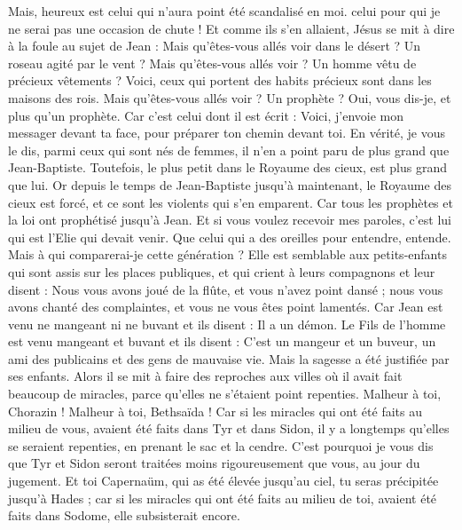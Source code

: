 \begin{multicols}{2}
Mais, heureux est celui qui n’aura point été scandalisé en moi.
celui pour qui je ne serai pas une occasion de chute !
Et comme ils s'en allaient, Jésus se mit à dire à la foule au sujet de Jean : Mais qu'êtes-vous allés voir dans le désert ? Un roseau agité par le vent ?
Mais qu'êtes-vous allés voir ? Un homme vêtu de précieux vêtements ? Voici, ceux qui portent des habits précieux sont dans les maisons des rois.
Mais qu'êtes-vous allés voir ? Un prophète ? Oui, vous dis-je, et plus qu'un prophète.
Car c’est celui dont il est écrit : Voici, j'envoie mon messager devant ta face, pour préparer ton chemin devant toi.
En vérité, je vous le dis, parmi ceux qui sont nés de femmes, il n'en a point paru de plus grand que Jean-Baptiste. Toutefois, le plus petit dans le Royaume des cieux, est plus grand que lui.
Or depuis le temps de Jean-Baptiste jusqu’à maintenant, le Royaume des cieux est forcé, et ce sont les violents qui s’en emparent.
Car tous les prophètes et la loi ont prophétisé jusqu'à Jean.
Et si vous voulez recevoir mes paroles, c'est lui qui est l'Elie qui devait venir.
Que celui qui a des oreilles pour entendre, entende.
Mais à qui comparerai-je cette génération ? Elle est semblable aux petits-enfants qui sont assis sur les places publiques, et qui crient à leurs compagnons
et leur disent : Nous vous avons joué de la flûte, et vous n'avez point dansé ; nous vous avons chanté des complaintes, et vous ne vous êtes point lamentés.
Car Jean est venu ne mangeant ni ne buvant et ils disent : Il a un démon.
Le Fils de l'homme est venu mangeant et buvant et ils disent : C’est un mangeur et un buveur, un ami des publicains et des gens de mauvaise vie. Mais la sagesse a été justifiée par ses enfants.
Alors il se mit à faire des reproches aux villes où il avait fait beaucoup de miracles, parce qu’elles ne s'étaient point repenties.
Malheur à toi, Chorazin ! Malheur à toi, Bethsaïda ! Car si les miracles qui ont été faits au milieu de vous, avaient été faits dans Tyr et dans Sidon, il y a longtemps qu'elles se seraient repenties, en prenant le sac et la cendre.
C'est pourquoi je vous dis que Tyr et Sidon seront traitées moins rigoureusement que vous, au jour du jugement.
Et toi Capernaüm, qui as été élevée jusqu’au ciel, tu seras précipitée jusqu’à Hades ; car si les miracles qui ont été faits au milieu de toi, avaient été faits dans Sodome, elle subsisterait encore.

\end{multicols}
